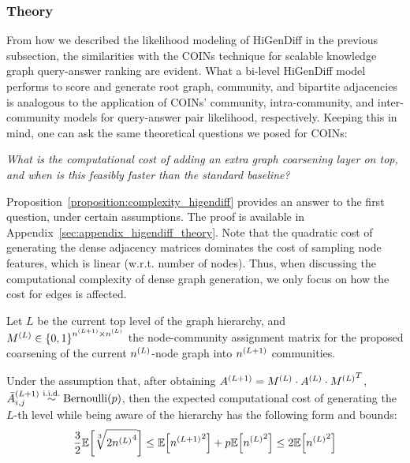 \begin{itemize}
\end{itemize}

\subsubsection{Theory}
From how we described the likelihood modeling of HiGenDiff in the previous subsection, the similarities with the COINs technique for scalable knowledge graph query-answer ranking are evident. What a bi-level HiGenDiff model performs to score and generate root graph, community, and bipartite adjacencies is analogous to the application of COINs' community, intra-community, and inter-community models for query-answer pair likelihood, respectively. Keeping this in mind, one can ask the same theoretical questions we posed for COINs: 
\begin{center}
    \emph{What is the computational cost of adding an extra graph coarsening layer on top, and when is this feasibly faster than the standard baseline?}
\end{center}
Proposition~\ref{proposition:complexity_higendiff} provides an answer to the first question, under certain assumptions. The proof is available in Appendix~\ref{sec:appendix_higendiff_theory}. Note that the quadratic cost of generating the dense adjacency matrices dominates the cost of sampling node features, which is linear (w.r.t. number of nodes). Thus, when discussing the computational complexity of dense graph generation, we only focus on how the cost for edges is affected.

\begin{proposition}
    \label{proposition:complexity_higendiff}
    Let $L$ be the current top level of the graph hierarchy, and $M^{\mathopen{}\left(L\right)} \in \mathopen{}\left\{0,1\right\}^{n^{\mathopen{}\left(L+1\right)}\times n^{\mathopen{}\left(L\right)}}$ the node-community assignment matrix for the proposed coarsening of the current $n^{\mathopen{}\left(L\right)}$-node graph into $n^{\mathopen{}\left(L+1\right)}$ communities. 
    
    Under the assumption that, after obtaining $A^{\mathopen{}\left(L+1\right)}=M^{\mathopen{}\left(L\right)} \cdot A^{\mathopen{}\left(L\right)} \cdot {M^{\mathopen{}\left(L\right)}}^T$, $\bar{A}_{i,j}^{\mathopen{}\left(L+1\right)} \overset{\text{i.i.d.}}{\sim} \text{Bernoulli}\mathopen{}\left(p\right)$, then the expected computational cost of generating the $L$-th level while being aware of the hierarchy has the following form and bounds:
    \begin{equation}
         \frac{3}{2}\mathbb{E}\mathopen{}\left[\sqrt[3]{2{n^{\mathopen{}\left(L\right)}}^4}\right] \leq \mathbb{E}\mathopen{}\left[{n^{\mathopen{}\left(L+1\right)}}^2\right] + p \mathbb{E}\mathopen{}\left[{n^{\mathopen{}\left(L\right)}}^2\right] \leq 2\mathbb{E}\mathopen{}\left[{n^{\mathopen{}\left(L\right)}}^2\right]
    \end{equation}
\end{proposition}


